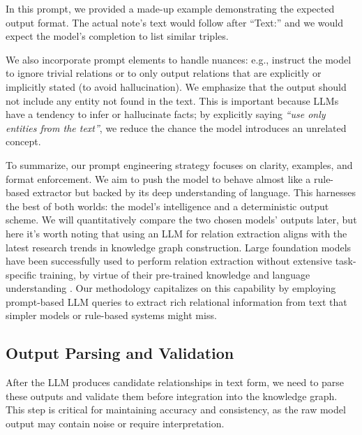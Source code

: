 In this prompt, we provided a made-up example demonstrating the expected output format. The actual note's text would follow after ``Text:'' and we would expect the model's completion to list similar triples.

We also incorporate prompt elements to handle nuances: e.g., instruct the model to ignore trivial relations or to only output relations that are explicitly or implicitly stated (to avoid hallucination). We emphasize that the output should not include any entity not found in the text. This is important because LLMs have a tendency to infer or hallucinate facts; by explicitly saying \textit{``use only entities from the text''}, we reduce the chance the model introduces an unrelated concept.

To summarize, our prompt engineering strategy focuses on clarity, examples, and format enforcement. We aim to push the model to behave almost like a rule-based extractor but backed by its deep understanding of language. This harnesses the best of both worlds: the model's intelligence and a deterministic output scheme. We will quantitatively compare the two chosen models' outputs later, but here it's worth noting that using an LLM for relation extraction aligns with the latest research trends in knowledge graph construction. Large foundation models have been successfully used to perform relation extraction without extensive task-specific training, by virtue of their pre-trained knowledge and language understanding \parencite{Singhal2022}. Our methodology capitalizes on this capability by employing prompt-based LLM queries to extract rich relational information from text that simpler models or rule-based systems might miss.

\subsection{Output Parsing and Validation}
\label{sec:outputparsing}

After the LLM produces candidate relationships in text form, we need to parse these outputs and validate them before integration into the knowledge graph. This step is critical for maintaining accuracy and consistency, as the raw model output may contain noise or require interpretation.

